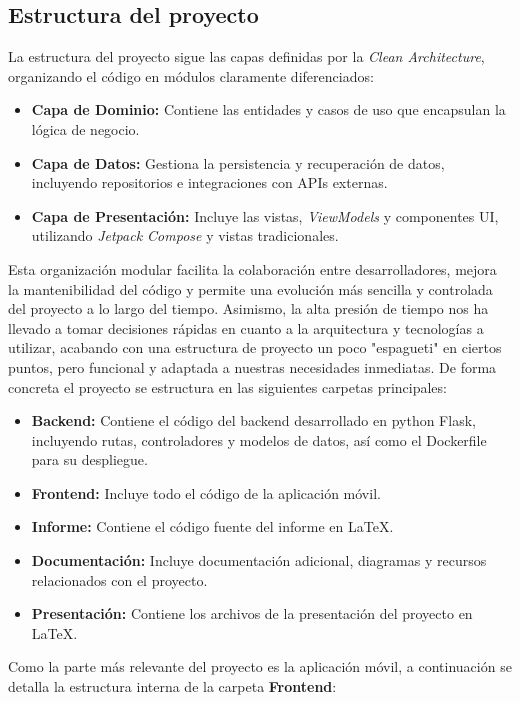 \subsection{Estructura del proyecto}
La estructura del proyecto sigue las capas definidas por la \textit{Clean Architecture}, organizando el código en
módulos claramente diferenciados:
\begin{itemize}
    \item \textbf{Capa de Dominio:} Contiene las entidades y casos de uso que encapsulan la lógica de negocio.
    \item \textbf{Capa de Datos:} Gestiona la persistencia y recuperación de datos, incluyendo repositorios e integraciones con APIs externas.
    \item \textbf{Capa de Presentación:} Incluye las vistas, \textit{ViewModels} y componentes UI, utilizando \textit{Jetpack Compose} y vistas tradicionales.
\end{itemize}
Esta organización modular facilita la colaboración entre desarrolladores, mejora la mantenibilidad del código y 
permite una evolución más sencilla y controlada del proyecto a lo largo del tiempo. \newline
Asimismo, la alta presión de tiempo nos ha llevado a tomar decisiones rápidas en cuanto a la arquitectura y 
tecnologías a utilizar, acabando con una estructura de proyecto un poco "espagueti" en ciertos puntos, pero funcional y
adaptada a nuestras necesidades inmediatas. De forma concreta el proyecto se estructura en las siguientes 
carpetas principales:
\begin{itemize}
    \item \textbf{Backend:} Contiene el código del backend desarrollado en python Flask, 
    incluyendo rutas, controladores y modelos de datos, así como el Dockerfile para su despliegue.
    \item \textbf{Frontend:} Incluye todo el código de la aplicación móvil.
    \item \textbf{Informe:} Contiene el código fuente del informe en LaTeX.
    \item \textbf{Documentación:} Incluye documentación adicional, diagramas y recursos relacionados con el proyecto.
    \item \textbf{Presentación:} Contiene los archivos de la presentación del proyecto en LaTeX.
\end{itemize}
Como la parte más relevante del proyecto es la aplicación móvil, a continuación se detalla la estructura interna de la 
carpeta \textbf{Frontend}:
